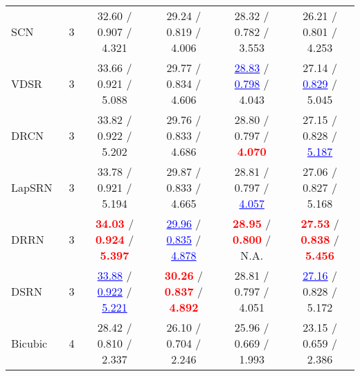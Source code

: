 \documentclass[10pt,twocolumn,letterpaper]{article}
\def\red#1{\textcolor{red}{#1}}
\def\blue#1{\textcolor{blue}{#1}}
\newcommand{\algname}{DSRN }
\begin{document}
\begin{table*}[t]
\begin{tabular}{lccccc}
SCN~\cite{wang2015deep}            & 3                      & 32.60 / 0.907 / 4.321                                                          & 29.24 / 0.819 / 4.006                                                          & 28.32 / 0.782 / 3.553                                                      & 26.21 / 0.801 / 4.253                                                          \\
VDSR~\cite{kim2016accurate}        & 3                      & 33.66 / 0.921 / 5.088                                                          & 29.77 / 0.834 / 4.606                                                          & \blue{\underline{28.83}} / \blue{\underline{0.798}} / 4.043                & 27.14 / \blue{\underline{0.829}} / 5.045                                       \\
DRCN~\cite{kim2016deeply}          & 3                      & 33.82 / 0.922 / 5.202                                                          & 29.76 / 0.833 / 4.686                                                          & 28.80 / 0.797 / \red{\bf 4.070}                                            & 27.15 / 0.828 / \blue{\underline{5.187}}                                       \\
LapSRN~\cite{lai2017deep}          & 3                      & 33.78 / 0.921 / 5.194                                                          & 29.87 / 0.833 / 4.665                                                          & 28.81 / 0.797 / \blue{\underline{4.057}}                                   & 27.06 / 0.827 / 5.168                                                          \\
DRRN~\cite{tai2017image}           & 3                      & \red{\bf 34.03} / \red{\bf 0.924} / \red{\bf 5.397}                            & \blue{\underline{29.96}} / \blue{\underline{0.835}} / \blue{\underline{4.878}} & \red{\bf 28.95} / \red{\bf 0.800} / N.A.                                   & \red{\bf 27.53} / \red{\bf 0.838} / \red{\bf 5.456}                            \\
\algname                           & 3                      & \blue{\underline{33.88}} / \blue{\underline{0.922}} / \blue{\underline{5.221}} & \red{\bf 30.26} / \red{\bf 0.837} / \red{\bf 4.892}                            & 28.81 / 0.797 / 4.051                                                      & \blue{\underline{27.16}} / 0.828 / 5.172                                       \\ \hline
Bicubic                            & 4                      & 28.42 / 0.810 / 2.337                                                          & 26.10 / 0.704 / 2.246                                                          & 25.96 / 0.669 / 1.993                                                      & 23.15 / 0.659 / 2.386                                                          \\

\end{tabular}
\end{table*}
\end{document}
